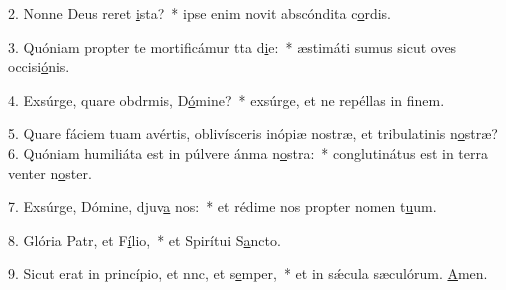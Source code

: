 2. Nonne Deus reret \uline{i}sta?~* ipse enim novit abscóndita c\uline{o}rdis.\par 
3. Quóniam propter te mortificámur tta d\uline{i}e:~* æstimáti sumus sicut oves occisi\uline{ó}nis.\par 
4. Exsúrge, quare obdrmis, D\uline{ó}mine?~* exsúrge, et ne repéllas in f\uline{i}nem.\par 
5. Quare fáciem tuam avértis, oblivísceris inópiæ nostræ, et tribulatinis n\uline{o}stræ?
6. Quóniam humiliáta est in púlvere ánma n\uline{o}stra:~* conglutinátus est in terra venter n\uline{o}ster.\par 
7. Exsúrge, Dómine, djuv\uline{a} nos:~* et rédime nos propter nomen t\uline{u}um.\par 
8. Glória Patr, et F\uline{í}lio,~* et Spirítui S\uline{a}ncto.\par 
9. Sicut erat in princípio, et nnc, et s\uline{e}mper,~* et in sǽcula sæculórum. \uline{A}men.\par 
